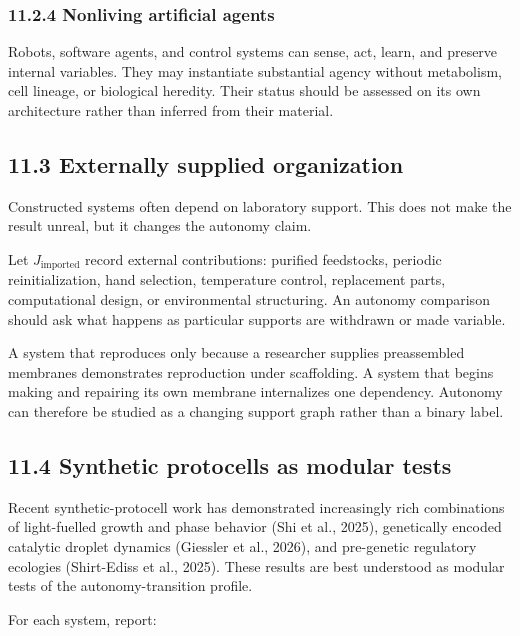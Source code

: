 \documentclass[
  11pt,
]{article}
\begin{document}
\subsubsection{11.2.4 Nonliving artificial
agents}\label{nonliving-artificial-agents}

Robots, software agents, and control systems can sense, act, learn, and
preserve internal variables. They may instantiate substantial agency
without metabolism, cell lineage, or biological heredity. Their status
should be assessed on its own architecture rather than inferred from
their material.

\subsection{11.3 Externally supplied
organization}\label{externally-supplied-organization}

Constructed systems often depend on laboratory support. This does not
make the result unreal, but it changes the autonomy claim.

Let \(J_{\mathrm{imported}}\) record external contributions: purified
feedstocks, periodic reinitialization, hand selection, temperature
control, replacement parts, computational design, or environmental
structuring. An autonomy comparison should ask what happens as
particular supports are withdrawn or made variable.

A system that reproduces only because a researcher supplies preassembled
membranes demonstrates reproduction under scaffolding. A system that
begins making and repairing its own membrane internalizes one
dependency. Autonomy can therefore be studied as a changing support
graph rather than a binary label.

\subsection{11.4 Synthetic protocells as modular
tests}\label{synthetic-protocells-as-modular-tests}

Recent synthetic-protocell work has demonstrated increasingly rich
combinations of light-fuelled growth and phase behavior (Shi et al.,
2025), genetically encoded catalytic droplet dynamics (Giessler et al.,
2026), and pre-genetic regulatory ecologies (Shirt-Ediss et al., 2025).
These results are best understood as modular tests of the
autonomy-transition profile.

For each system, report:
\end{document}
